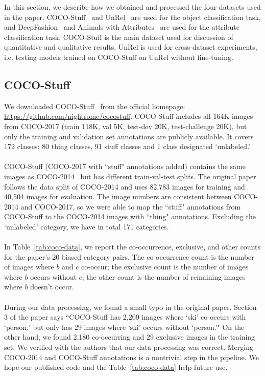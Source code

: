 In this section, we describe how we obtained and processed the four datasets used in the paper. COCO-Stuff~\cite{caesar2018cvpr} and UnRel~\cite{Peyre17} are used for the object classification task, and DeepFashion~\cite{liuLQWTcvpr16DeepFashion} and Animals with Attributes~\cite{AwA} are used for the attribute classification task. COCO-Stuff is the main dataset used for discussion of quantitative and qualitative results. UnRel is used for cross-dataset experiments, i.e. testing models trained on COCO-Stuff on UnRel without fine-tuning.

\subsection{COCO-Stuff}
We downloaded COCO-Stuff~\cite{caesar2018cvpr} from the official homepage: \url{https://github.com/nightrome/cocostuff}. COCO-Stuff includes all 164K images from COCO-2017 (train 118K, val 5K, test-dev 20K, test-challenge 20K), but only the training and validation set annotations are publicly available. It covers 172 classes: 80 thing classes, 91 stuff classes and 1 class designated `unlabeled.'\\
\\
COCO-Stuff (COCO-2017 with ``stuff" annotations added) contains the same images as COCO-2014~\cite{COCO} but has different train-val-test splits. The original paper follows the data split of COCO-2014 and uses 82,783 images for training and 40,504 images for evaluation. The image numbers are consistent between COCO-2014 and COCO-2017, so we were able to map the ``stuff" annotations from COCO-Stuff to the COCO-2014 images with ``thing" annotations. Excluding the `unlabeled' category, we have in total 171 categories.\\
\\
In Table~\ref{tab:coco-data}, we report the co-occurrence, exclusive, and other counts for the paper's 20 biased category pairs. The co-occurrence count is the number of images where $b$ and $c$ co-occur; the exclusive count is the number of images where $b$ occurs without $c$; the other count is the number of remaining images where $b$ doesn't occur.\\
\\
During our data processing, we found a small typo in the original paper. Section 3 of the paper says ``COCO-Stuff has 2,209 images where `ski' co-occurs with `person,' but only has 29 images where `ski' occurs without `person.'" On the other hand, we found 2,180 co-occurring and 29 exclusive images in the training set. We verified with the authors that our data processing was correct. Merging COCO-2014 and COCO-Stuff annotations is a nontrivial step in the pipeline. We hope our published code and the Table~\ref{tab:coco-data} help future use.

